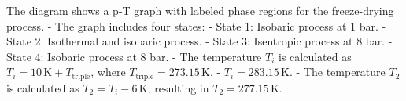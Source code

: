 The diagram shows a p-T graph with labeled phase regions for the freeze-drying process.  
- The graph includes four states:  
  - State 1: Isobaric process at 1 bar.  
  - State 2: Isothermal and isobaric process.  
  - State 3: Isentropic process at 8 bar.  
  - State 4: Isobaric process at 8 bar.  
- The temperature \( T_i \) is calculated as \( T_i = 10 \, \text{K} + T_{\text{triple}} \), where \( T_{\text{triple}} = 273.15 \, \text{K} \).  
  - \( T_i = 283.15 \, \text{K} \).  
- The temperature \( T_2 \) is calculated as \( T_2 = T_i - 6 \, \text{K} \), resulting in \( T_2 = 277.15 \, \text{K} \).